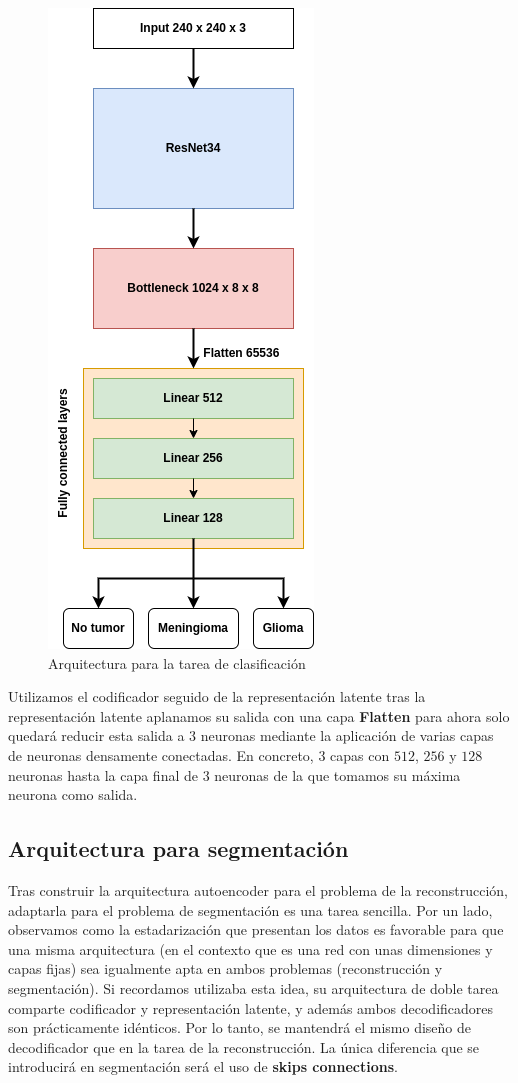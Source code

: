 \begin{figure}[H]
	\centering
	\includegraphics[width=0.3\linewidth]{imagenes/arquitectura_clasificacion.png}
	\caption{Arquitectura para la tarea de clasificación}
\end{figure}

Utilizamos el codificador seguido de la representación latente tras la representación latente aplanamos su salida con una capa \textbf{Flatten} para ahora solo quedará reducir esta salida a $3$ neuronas mediante la aplicación de varias capas de neuronas densamente conectadas. En concreto, $3$ capas con $512$, $256$ y $128$ neuronas hasta la capa final de $3$ neuronas de la que tomamos su máxima neurona como salida.

\subsection{Arquitectura para segmentación}

Tras construir la arquitectura autoencoder para el problema de la reconstrucción, adaptarla para el problema de segmentación es una tarea sencilla. Por un lado, observamos como la estadarización que presentan los datos es favorable para que una misma arquitectura (en el contexto que es una red con unas dimensiones y capas fijas) sea igualmente apta en ambos problemas (reconstrucción y segmentación). Si recordamos \cite{myronenko20193d} utilizaba esta idea, su arquitectura de doble tarea comparte codificador y representación latente, y además ambos decodificadores son prácticamente idénticos. Por lo tanto, se mantendrá el mismo diseño de decodificador que en la tarea de la reconstrucción. La única diferencia que se introducirá en segmentación será el uso de \textbf{skips connections}.


